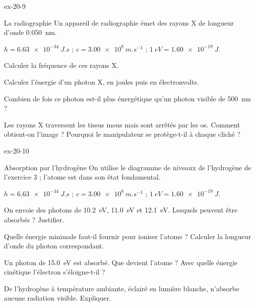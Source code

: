\begin{blocLivre}{ex-20-9}
\begin{exercice}[2]{La radiographie}
Un appareil de radiographie émet des rayons X de longueur d'onde \qty{0,050}{nm}.
\begin{donnees}
$h=\qty{6,63e-34}{J.s}$ ; $c=\qty{3,00e8}{m.s^{-1}}$ ; $\qty{1}{eV}=\qty{1,60e-19}{J}$.
\end{donnees}
\begin{questions}
\item Calculer la fréquence de ces rayons X.
\item Calculer l'énergie d'un photon X, en joules puis en électronvolts.
\item Combien de fois ce photon est-il plus énergétique qu'un photon visible de \qty{500}{nm} ?
\item Les rayons X traversent les tissus mous mais sont arrêtés par les os. Comment obtient-on l'image ? Pourquoi le manipulateur se
protège-t-il à chaque cliché ?
\end{questions}
\end{exercice}
\end{blocLivre}
\begin{blocLivre}{ex-20-10}
\begin{exercice}[2]{Absorption par l'hydrogène}
On utilise le diagramme de niveaux de l'hydrogène de l'exercice 3 ; l'atome est dans son état fondamental.
\begin{donnees}
$h=\qty{6,63e-34}{J.s}$ ; $c=\qty{3,00e8}{m.s^{-1}}$ ; $\qty{1}{eV}=\qty{1,60e-19}{J}$.
\end{donnees}
\begin{questions}
\item On envoie des photons de \qty{10,2}{eV}, \qty{11,0}{eV} et \qty{12,1}{eV}. Lesquels peuvent être absorbés ? Justifier.
\item Quelle énergie minimale faut-il fournir pour ioniser l'atome ? Calculer la longueur d'onde du photon correspondant.
\item Un photon de \qty{15,0}{eV} est absorbé. Que devient l'atome ? Avec quelle énergie cinétique l'électron s'éloigne-t-il ?
\item De l'hydrogène à température ambiante, éclairé en lumière blanche, n'absorbe aucune radiation visible. Expliquer.
\end{questions}
\end{exercice}
\end{blocLivre}

